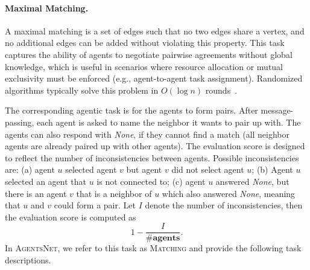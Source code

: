 \documentclass{article}
\newlength{\chatlogwidth}
\newlength{\chattextwidth}
\newlength{\chatinnerwidth}
\newcommand{\setChatlogWidth}[1]{
  \setlength{\chatlogwidth}{#1}
  \setlength{\chatinnerwidth}{\chatlogwidth-35pt}
  \setlength{\chattextwidth}{0.90\chatinnerwidth}
}
\newenvironment{chatlog}{
  \noindent
  \begin{minipage}{\chatlogwidth}
  \begin{mdframed}[
    backgroundcolor=chatbg,
    leftline=true,
    rightline=false,
    topline=false,
    bottomline=false,
    linecolor=chatsideline,
    linewidth=3pt,
    innerleftmargin=15pt,
    innerrightmargin=20pt,
    innertopmargin=10pt,
    innerbottommargin=5pt
  ]
}{
  \vspace{-0.2em}
  \end{mdframed}
  \end{minipage}
}
\newcommand{\benchmark}{\textsc{AgentsNet}}
\begin{document}
\setChatlogWidth{\textwidth}
\begin{chatlog}
\end{chatlog}

\setChatlogWidth{\textwidth}
\begin{chatlog}
\end{chatlog}

\paragraph{Maximal Matching.} A maximal matching is a set of edges such that no two edges share a vertex, and no additional edges can be added without violating this property. This task captures the ability of agents to negotiate pairwise agreements without global knowledge, which is useful in scenarios where resource allocation or mutual exclusivity must be enforced (e.g., agent-to-agent task assignment).
Randomized algorithms typically solve this problem in $O(\log n)$ rounds~\cite{peleg2000distributed}. 

The corresponding agentic task is for the agents to form pairs. After message-passing, each agent is asked to name the neighbor it wants to pair up with. The agents can also respond with \textit{None}, if they cannot find a match (all neighbor agents are already paired up with other agents). The evaluation score is designed to reflect the number of inconsistencies between agents. Possible inconsistencies are: (a) agent $u$ selected agent $v$ but agent $v$ did not select agent $u$; (b) Agent $u$ selected an agent that $u$ is not connected to; (c) agent $u$ answered \textit{None}, but there is an agent $v$ that is a neighbor of $u$ which also answered \textit{None}, meaning that $u$ and $v$ could form a pair. Let $I$ denote the number of inconsistencies, then the evaluation score is computed as
\begin{equation*}
    1 - \frac{I}{\#\mathbf{agents}}.
\end{equation*}
In \benchmark{}, we refer to this task as \textsc{Matching} and provide the following task descriptions.
\end{document}
